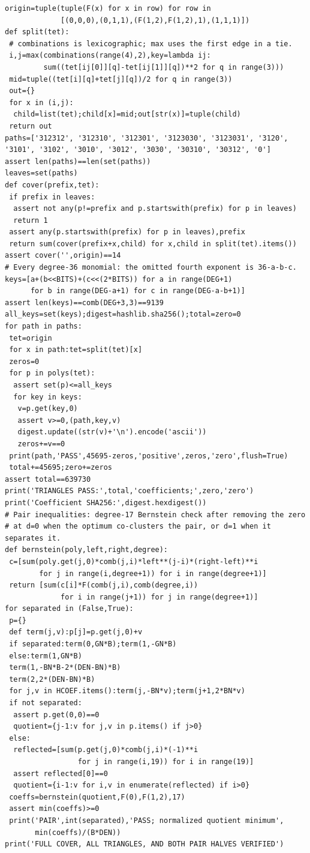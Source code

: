 \documentclass[11pt]{article}
\begin{document}
\begin{Verbatim}[fontsize=\scriptsize,breaklines=true,breakanywhere=true]
origin=tuple(tuple(F(x) for x in row) for row in
             [(0,0,0),(0,1,1),(F(1,2),F(1,2),1),(1,1,1)])
def split(tet):
 # combinations is lexicographic; max uses the first edge in a tie.
 i,j=max(combinations(range(4),2),key=lambda ij:
         sum((tet[ij[0]][q]-tet[ij[1]][q])**2 for q in range(3)))
 mid=tuple((tet[i][q]+tet[j][q])/2 for q in range(3))
 out={}
 for x in (i,j):
  child=list(tet);child[x]=mid;out[str(x)]=tuple(child)
 return out
paths=['312312', '312310', '312301', '3123030', '3123031', '3120', '3101', '3102', '3010', '3012', '3030', '30310', '30312', '0']
assert len(paths)==len(set(paths))
leaves=set(paths)
def cover(prefix,tet):
 if prefix in leaves:
  assert not any(p!=prefix and p.startswith(prefix) for p in leaves)
  return 1
 assert any(p.startswith(prefix) for p in leaves),prefix
 return sum(cover(prefix+x,child) for x,child in split(tet).items())
assert cover('',origin)==14
# Every degree-36 monomial: the omitted fourth exponent is 36-a-b-c.
keys=[a+(b<<BITS)+(c<<(2*BITS)) for a in range(DEG+1)
      for b in range(DEG-a+1) for c in range(DEG-a-b+1)]
assert len(keys)==comb(DEG+3,3)==9139
all_keys=set(keys);digest=hashlib.sha256();total=zero=0
for path in paths:
 tet=origin
 for x in path:tet=split(tet)[x]
 zeros=0
 for p in polys(tet):
  assert set(p)<=all_keys
  for key in keys:
   v=p.get(key,0)
   assert v>=0,(path,key,v)
   digest.update((str(v)+'\n').encode('ascii'))
   zeros+=v==0
 print(path,'PASS',45695-zeros,'positive',zeros,'zero',flush=True)
 total+=45695;zero+=zeros
assert total==639730
print('TRIANGLES PASS:',total,'coefficients;',zero,'zero')
print('Coefficient SHA256:',digest.hexdigest())
# Pair inequalities: degree-17 Bernstein check after removing the zero
# at d=0 when the optimum co-clusters the pair, or d=1 when it separates it.
def bernstein(poly,left,right,degree):
 c=[sum(poly.get(j,0)*comb(j,i)*left**(j-i)*(right-left)**i
        for j in range(i,degree+1)) for i in range(degree+1)]
 return [sum(c[i]*F(comb(j,i),comb(degree,i))
             for i in range(j+1)) for j in range(degree+1)]
for separated in (False,True):
 p={}
 def term(j,v):p[j]=p.get(j,0)+v
 if separated:term(0,GN*B);term(1,-GN*B)
 else:term(1,GN*B)
 term(1,-BN*B-2*(DEN-BN)*B)
 term(2,2*(DEN-BN)*B)
 for j,v in HCOEF.items():term(j,-BN*v);term(j+1,2*BN*v)
 if not separated:
  assert p.get(0,0)==0
  quotient={j-1:v for j,v in p.items() if j>0}
 else:
  reflected=[sum(p.get(j,0)*comb(j,i)*(-1)**i
                 for j in range(i,19)) for i in range(19)]
  assert reflected[0]==0
  quotient={i-1:v for i,v in enumerate(reflected) if i>0}
 coeffs=bernstein(quotient,F(0),F(1,2),17)
 assert min(coeffs)>=0
 print('PAIR',int(separated),'PASS; normalized quotient minimum',
       min(coeffs)/(B*DEN))
print('FULL COVER, ALL TRIANGLES, AND BOTH PAIR HALVES VERIFIED')
\end{Verbatim}
\end{document}
